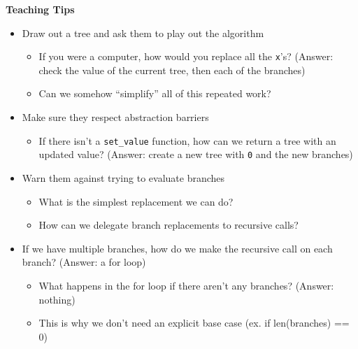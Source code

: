 \begin{guide}
	\begin{blocksection}
	\textbf{Teaching Tips}
	\begin{itemize}
			\item Draw out a tree and ask them to play out the algorithm
			\begin{itemize}
	                \item If you were a computer, how would you replace all the \lstinline{x}'s? (Answer: check the value of the current tree, then each of the branches)
	                \item Can we somehow “simplify” all of this repeated work?
            \end{itemize}
		\item Make sure they respect abstraction barriers 
            \begin{itemize}
                \item If there isn't a \lstinline{set_value} function, how can we return a tree with an updated value? (Answer: create a new tree with \lstinline{0} and the new branches)
            \end{itemize}
		\item Warn them against trying to evaluate branches
            \begin{itemize}
                \item What is the simplest replacement we can do?
                \item How can we delegate branch replacements to recursive calls?
            \end{itemize}
            \item If we have multiple branches, how do we make the recursive call on each branch? (Answer: a for loop)
            \begin{itemize}
                \item What happens in the for loop if there aren’t any branches? (Answer: nothing)
                \item This is why we don’t need an explicit base case (ex. if len(branches) == 0)
            \end{itemize}
	\end{itemize}
	\end{blocksection}
\end{guide}

